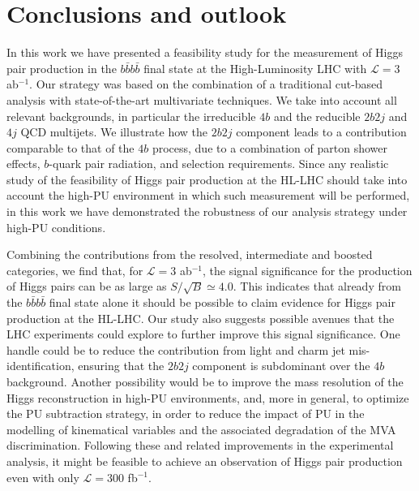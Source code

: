 \section{Conclusions and outlook}
\label{sec:conclusions}

In this work we have presented a feasibility study for
 the measurement of Higgs pair production in the $b\bar{b}b\bar{b}$
final state at the High-Luminosity LHC with $\mathcal{L}=3$ ab$^{-1}$.
%
Our strategy was based on the combination of a traditional
cut-based analysis with state-of-the-art multivariate techniques.
%
We take into account 
all relevant backgrounds, in particular
the irreducible $4b$
and the reducible 
$2b2j$ and $4j$ QCD multijets.
%
We illustrate how the $2b2j$ component leads to
a contribution comparable to that of the $4b$ process,
due to a combination of  parton shower effects, $b$-quark 
pair radiation, and selection requirements.
%
Since any realistic study of the feasibility of Higgs pair
production at the HL-LHC should take into account the
high-PU environment in which such measurement will be performed,
in this work we have demonstrated the robustness of our analysis strategy
under high-PU conditions.

Combining the contributions from the resolved,
intermediate and boosted categories, we find that, for
$\mathcal{L}=3$ ab$^{-1}$, the
signal significance for
the production of Higgs pairs can be as large as $S/\sqrt{B}\simeq 4.0$.
%
This indicates that already from the $b\bar{b}b\bar{b}$
final state alone
it should be possible to claim evidence for Higgs pair production at
the HL-LHC.
%
Our study also suggests possible avenues that the LHC experiments
could explore to further improve this signal significance.
%
One handle could be to reduce the contribution from light and charm
jet mis-identification, ensuring that the
$2b2j$ component is subdominant over the $4b$ background.
%
Another possibility would be to improve the mass resolution of the Higgs
reconstruction
in high-PU environments, and, more in general,
to optimize the PU subtraction
strategy, in order
to reduce the impact of PU in the modelling
of kinematical variables and the associated
degradation of the MVA discrimination.
%
Following these and related improvements in the experimental
analysis, it might be feasible to achieve
an observation of Higgs pair production even with only
$\mathcal{L}=300$ fb$^{-1}$.

